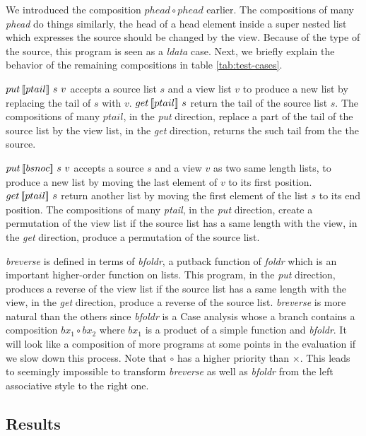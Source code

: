 We introduced the composition $phead \circ phead$ earlier. The compositions of many \textit{phead} do things similarly, the head of a head element inside a super nested list which expresses the source should be changed by the view. Because of the type of the source, this program is seen as a \textit{ldata} case. Next, we briefly explain the behavior of the remaining compositions in table \ref{tab:test-cases}.

$put \, [\![ptail]\!] \ s \ v$ accepts a source list $s$ and a view list $v$ to produce a new list by replacing the tail of $s$ with $v$. $get \, [\![ptail]\!] \ s$ return the tail of the source list $s$. The compositions of many $ptail$, in the \textit{put} direction, replace a part of the tail of the source list by the view list, in the \textit{get} direction, returns the such tail from the the source.

$put \, [\![bsnoc]\!] \ s \ v$ accepts a source $s$ and a view $v$ as two same length lists, to produce a new list by moving the last element of $v$ to its first position. $get \, [\![ptail]\!] \ s$ return another list by moving the first element of the list $s$ to its end position. The compositions of many \textit{ptail}, in the \textit{put} direction, create a permutation of the view list if the source list has a same length with the view, in the \textit{get} direction, produce a permutation of the source list.

\textit{breverse} is defined in terms of \textit{bfoldr}, a putback function of \textit{foldr} which is an important higher-order function on lists. This program, in the \textit{put} direction, produces a reverse of the view list if the source list has a same length with the view, in the \textit{get} direction, produce a reverse of the source list. \textit{breverse} is more natural than the others since \textit{bfoldr} is a Case analysis whose a branch contains a composition $bx_1 \circ bx_2$ where $bx_1$ is a product of a simple function and \textit{bfoldr}. It will look like a composition of more programs at some points in the evaluation if we slow down this process. Note that $\circ$ has a higher priority than $\times$. This leads to seemingly impossible to transform \textit{breverse} as well as \textit{bfoldr} from the left associative style to the right one. 

\subsection{Results}



